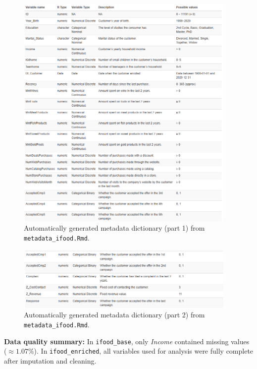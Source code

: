 \begin{figure}[H]
    \centering
    \includegraphics[width=0.95\textwidth]{Imatges/metadata6.png}
    \caption{Automatically generated metadata dictionary (part 1) from \texttt{metadata\_ifood.Rmd}.}
    \label{fig:metadata1}
\end{figure}

\begin{figure}[H]
    \centering
    \includegraphics[width=0.95\textwidth]{Imatges/metadata7.png}
    \caption{Automatically generated metadata dictionary (part 2) from \texttt{metadata\_ifood.Rmd}.}
    \label{fig:metadata2}
\end{figure}

\noindent
\textbf{Data quality summary:} In \texttt{ifood\_base}, only \textit{Income} contained missing values
($\approx 1.07\%$). In \texttt{ifood\_enriched}, all variables used for analysis were
fully complete after imputation and cleaning.

